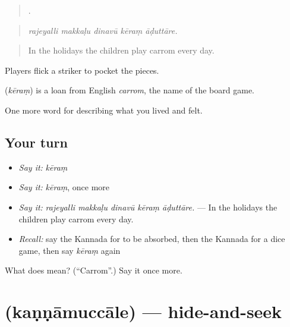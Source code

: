 \begin{quote}
    .
\end{quote}

\begin{quote}
\emph{rajeyalli makkaḷu dinavū kēraṃ āḍuttāre.}
\end{quote}

\begin{quote}
In the holidays the children play carrom every day.
\end{quote}

Players flick a striker to pocket the pieces.

\begin{cousinweb}
\textbf{} (\emph{kēraṃ}) is a loan from English \emph{carrom}, the name of the board game.
\end{cousinweb}

\begin{grammarlens}[title={What you've built}]
One more word for describing what you lived and felt.
\end{grammarlens}

\subsection*{Your turn}
\begin{itemize}
\raggedright
  \item \emph{Say it:} \emph{kēraṃ}
  \item \emph{Say it:} \emph{kēraṃ}, once more
  \item \emph{Say it:} \emph{rajeyalli makkaḷu dinavū kēraṃ āḍuttāre.} — In the holidays the children play carrom every day.
  \item \emph{Recall:} say the Kannada for to be absorbed, then the Kannada for a dice game, then say \emph{kēraṃ} again
\end{itemize}

\begin{tcolorbox}[breakable,colback=teal!4,colframe=teal!35!black,title={Before you move on}]
What does  mean? (\textquotedblleft{}Carrom\textquotedblright{}.) Say it once more.
\end{tcolorbox}
\section[\texorpdfstring{\kn{ಕಣ್ಣಾಮುಚ್ಚಾಲೆ} (kaṇṇāmuccāle)}{ಕಣ್ಣಾಮುಚ್ಚಾಲೆ (kaṇṇāmuccāle)}]{ (kaṇṇāmuccāle) — hide-and-seek}

